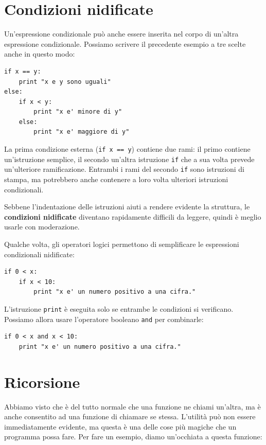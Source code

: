 \documentclass[10pt]{book}
\begin{document}
\section{Condizioni nidificate}

Un'espressione condizionale può anche essere inserita nel corpo di un'altra espressione condizionale. Possiamo scrivere il precedente esempio a tre scelte anche in questo modo:

\begin{verbatim}
if x == y:
    print "x e y sono uguali"
else:
    if x < y:
        print "x e' minore di y"
    else:
        print "x e' maggiore di y"
\end{verbatim}
%
La prima condizione esterna ({\tt if x == y}) contiene due rami: il primo contiene un'istruzione semplice, il secondo un'altra istruzione {\tt if} che a sua volta prevede un'ulteriore ramificazione. Entrambi i rami del secondo {\tt if} sono istruzioni di stampa, ma potrebbero anche contenere a loro volta ulteriori istruzioni condizionali.


Sebbene l'indentazione delle istruzioni aiuti a rendere evidente la struttura, le {\bf condizioni nidificate} diventano rapidamente difficili da leggere, quindi è meglio usarle con moderazione.

Qualche volta, gli operatori logici permettono di semplificare le espressioni condizionali nidificate:

\begin{verbatim}
if 0 < x:
    if x < 10:
        print "x e' un numero positivo a una cifra."
\end{verbatim}
%
L'istruzione {\tt print} è eseguita solo se entrambe le condizioni si verificano. Possiamo allora usare l'operatore booleano {\tt and} per combinarle:

\begin{verbatim}
if 0 < x and x < 10:
    print "x e' un numero positivo a una cifra."
\end{verbatim}


\section{Ricorsione}
\label{recursion}

Abbiamo visto che è del tutto normale che una funzione ne chiami un'altra, ma è anche consentito ad una funzione di chiamare se stessa. L'utilità può non essere immediatamente evidente, ma questa è una delle cose più magiche che un programma possa fare. Per fare un esempio, diamo un'occhiata a questa funzione:
\end{document}
